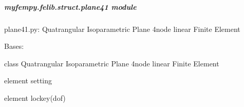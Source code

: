 \documentclass[letterpaper,10pt,english]{sphinxmanual}
\begin{document}
\subparagraph{myfempy.felib.struct.plane41 module}
\label{\detokenize{myfempy.felib.struct:module-myfempy.felib.struct.plane41}}\label{\detokenize{myfempy.felib.struct:myfempy-felib-struct-plane41-module}}
\sphinxAtStartPar
plane41.py: Quatrangular Isoparametric Plane 4\sphinxhyphen{}node linear Finite Element

\begin{fulllineitems}
\label{\detokenize{myfempy.felib.struct:myfempy.felib.struct.plane41.Plane41}}
\pysigstartsignatures
{}
\pysigstopsignatures
\sphinxAtStartPar
Bases: 

\sphinxAtStartPar
class Quatrangular Isoparametric Plane 4\sphinxhyphen{}node linear Finite Element

\begin{fulllineitems}
\label{\detokenize{myfempy.felib.struct:myfempy.felib.struct.plane41.Plane41.elemset}}
\pysigstartsignatures
{}
\pysigstopsignatures
\sphinxAtStartPar
element setting

\end{fulllineitems}


\begin{fulllineitems}
\label{\detokenize{myfempy.felib.struct:myfempy.felib.struct.plane41.Plane41.lockey}}
\pysigstartsignatures
{}
\pysigstopsignatures
\sphinxAtStartPar
element lockey(dof)

\end{fulllineitems}


\end{fulllineitems}
\end{document}
